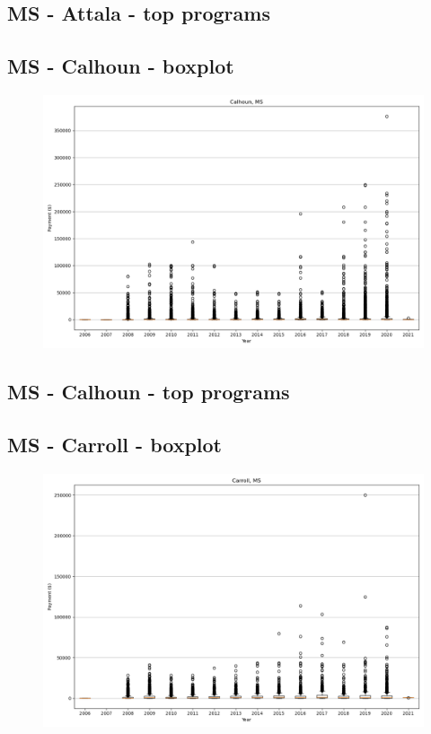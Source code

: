 \subsection*{MS - Attala - top programs}

\newpage
\subsection*{MS - Calhoun - boxplot}
\begin{figure}[h]
\centering
\includegraphics[width=7in]{../output/boxplots/counties/Calhoun-MS_boxplot.png}
\end{figure}


\subsection*{MS - Calhoun - top programs}

\newpage
\subsection*{MS - Carroll - boxplot}
\begin{figure}[h]
\centering
\includegraphics[width=7in]{../output/boxplots/counties/Carroll-MS_boxplot.png}
\end{figure}


